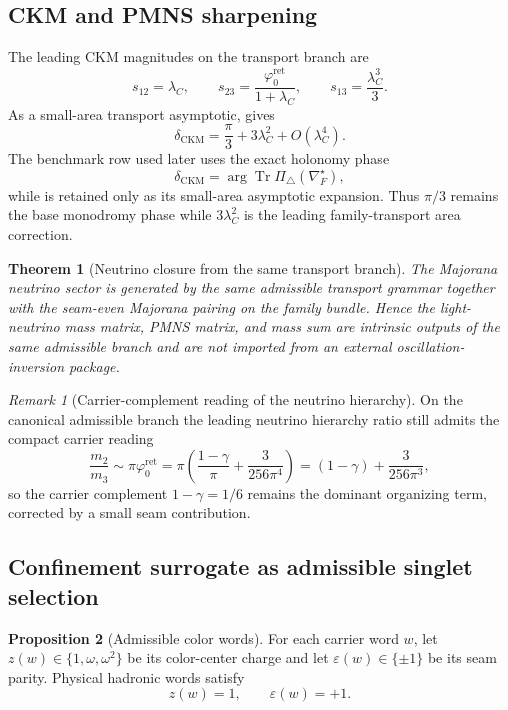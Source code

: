 \documentclass[11pt,a4paper]{article}
\newtheorem{theorem}{Theorem}[section]
\theoremstyle{definition}
\newtheorem{proposition}[theorem]{Proposition}
\theoremstyle{remark}
\newtheorem*{remark}{Remark}
\DeclareMathOperator{\tr}{Tr}
\newcommand{\phiz}{\varphi_0^{\mathrm{ret}}}
\begin{document}
\subsection{CKM and PMNS sharpening}

The leading CKM magnitudes on the transport branch are
\begin{equation}
\label{eq:ckm-magnitudes}
s_{12}=\lambda_C,
\qquad
s_{23}=\frac{\phiz}{1+\lambda_C},
\qquad
s_{13}=\frac{\lambda_C^3}{3}.
\end{equation}
As a small-area transport asymptotic,  gives
\begin{equation}
\label{eq:ckm-phase}
\delta_{\mathrm{CKM}}=\frac{\pi}{3}+3\lambda_C^2+O(\lambda_C^4).
\end{equation}
The benchmark row used later uses the exact holonomy phase
\[
\delta_{\mathrm{CKM}}=\arg\tr\Pi_\triangle(\nabla_F^\star),
\]
while  is retained only as its small-area asymptotic expansion. Thus
$\pi/3$ remains the base monodromy phase while $3\lambda_C^2$ is the leading
family-transport area correction.

\begin{theorem}[Neutrino closure from the same transport branch]
The Majorana neutrino sector is generated by the same admissible transport grammar together
with the seam-even Majorana pairing on the family bundle. Hence the light-neutrino mass
matrix, PMNS matrix, and mass sum are intrinsic outputs of the same admissible branch and are
not imported from an external oscillation-inversion package.
\end{theorem}

\begin{remark}[Carrier-complement reading of the neutrino hierarchy]
On the canonical admissible branch the leading neutrino hierarchy ratio still admits the
compact carrier reading
\[
\frac{m_2}{m_3}\sim \pi\phiz
=
\pi\!\left(\frac{1-\gamma}{\pi}+\frac{3}{256\pi^4}\right)
=
(1-\gamma)+\frac{3}{256\pi^3},
\]
so the carrier complement $1-\gamma=1/6$ remains the dominant organizing term, corrected by a
small seam contribution.
\end{remark}

\subsection{Confinement surrogate as admissible singlet selection}

\begin{proposition}[Admissible color words]
For each carrier word $w$, let $z(w)\in\{1,\omega,\omega^2\}$ be its color-center charge and let $\varepsilon(w)\in\{\pm1\}$ be its seam parity. Physical hadronic words satisfy
\[
z(w)=1,
\qquad
\varepsilon(w)=+1.
\]
\end{proposition}
\end{document}
